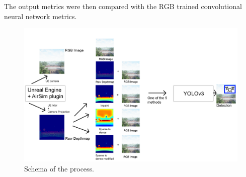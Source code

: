 \documentclass[twoside]{ctuthesis}
\theoremstyle{plain}
\theoremstyle{definition}
\theoremstyle{note}
\begin{document}
The output metrics were then compared with the RGB trained convolutional neural network metrics.
\begin{figure}
	\centering
	\includegraphics[width=\textwidth]{detection_schema.png}
	\caption{Schema of the process.}
	\label{fig:intro}
\end{figure}
\end{document}
